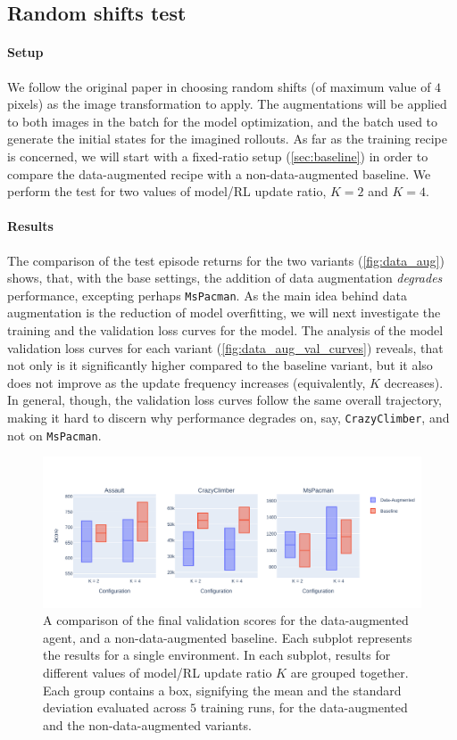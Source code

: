 \documentclass[en]{pracamgr}
\newcommand{\env}[1]{{\tt #1}}
\newcommand{\figurewidth}{\linewidth}
\newcommand{\figureheight}{0.8\paperheight}
\begin{document}
\subsection{Random shifts test}
\label{ssec:random_shift}

\paragraph{Setup} We follow the original paper in choosing random shifts (of maximum value of $4$ pixels) as the image transformation to apply. The augmentations will be applied to both images in the batch for the model optimization, and the batch used to generate the initial states for the imagined rollouts. As far as the training recipe is concerned, we will start with a fixed-ratio setup (\autoref{sec:baseline}) in order to compare the data-augmented recipe with a non-data-augmented baseline. We perform the test for two values of model/RL update ratio, $K = 2$ and $K = 4$.

\paragraph{Results} The comparison of the test episode returns for the two variants (\autoref{fig:data_aug}) shows, that, with the base settings, the addition of data augmentation \emph{degrades} performance, excepting perhaps \env{MsPacman}. As the main idea behind data augmentation is the reduction of model overfitting, we will next investigate the training and the validation loss curves for the model. The analysis of the model validation loss curves for each variant (\autoref{fig:data_aug_val_curves}) reveals, that not only is it significantly higher compared to the baseline variant, but it also does not improve as the update frequency increases (equivalently, $K$ decreases). In general, though, the validation loss curves follow the same overall trajectory, making it hard to discern why performance degrades on, say, \env{CrazyClimber}, and not on \env{MsPacman}.

\begin{figure}
  \centering
  \includegraphics[width=\figurewidth,height=\figureheight,keepaspectratio]{assets/data_aug.pdf}
  \caption{A comparison of the final validation scores for the data-augmented agent, and a non-data-augmented baseline. Each subplot represents the results for a single environment. In each subplot, results for different values of model/RL update ratio $K$ are grouped together. Each group contains a box, signifying the mean and the standard deviation evaluated across $5$ training runs, for the data-augmented and the non-data-augmented variants.}
  \label{fig:data_aug}
\end{figure}
\end{document}
